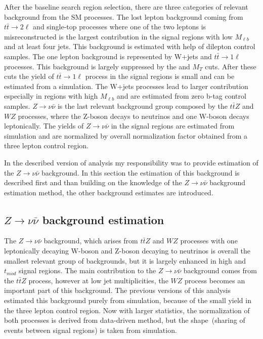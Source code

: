 After the baseline search region selection, there are three categories of relevant background from the SM processes. The lost lepton background coming from $t\bar{t} \to 2 \ell$ and single-top processes where one of the two leptons is misreconstructed is the largest contribution in the signal regions with low $M_{\ell b}$ and at least four jets. This background is estimated with help of dilepton control samples. The one lepton background is represented by W+jets and $t\bar{t} \to 1\ell$ processes. This background is largely suppressed by the \MET and $M_{T}$ cuts. After these cuts the yield of $t\bar{t} \to 1\ell$ process in the signal regions is small and can be estimated from a simulation. The W+jets processes lead to larger contribution especially in regions with high $M_{\ell b}$ and are estimated from zero b-tag control samples. $Z \to \nu \bar{\nu}$ is the last relevant background group composed by the $t\bar{t}Z$ and $WZ$ processes, where the Z-boson decays to neutrinos and one W-boson decays leptonically. The yields of $Z \to \nu \bar{\nu}$ in the signal regions are estimated from simulation and are normalized by overall normalization factor obtained from a three lepton control region.  

In the described version of analysis my responsibility was to provide estimation of the $Z \to \nu \bar{\nu}$ background. In this section the estimation of this background is described first and than building on the knowledge of the $Z \to \nu \bar{\nu}$ background estimation method, the other background estimates are introduced.


\subsection{$Z \to \nu \bar{\nu}$ background estimation}

The $Z \to \nu \bar{\nu}$ background, which arises from $t\bar{t}Z$ and $WZ$ processes with one leptonically decaying W-boson and Z-boson decaying to neutrinos is overall the smallest relevant group of backgrounds, but it is largely enhanced in high \MET and $t_{mod}$ signal regions. The main contribution to the $Z \to \nu \bar{\nu}$ background comes from the $t\bar{t}Z$ process, however at low jet multiplicities, the $WZ$ process becomes an important part of this background.  The previous versions of this analysis estimated this background purely from simulation, because of the small yield in the three lepton control region. Now with larger statistics, the normalization of both processes is derived from data-driven method, but the shape~(sharing of events between signal regions) is taken from simulation. 

